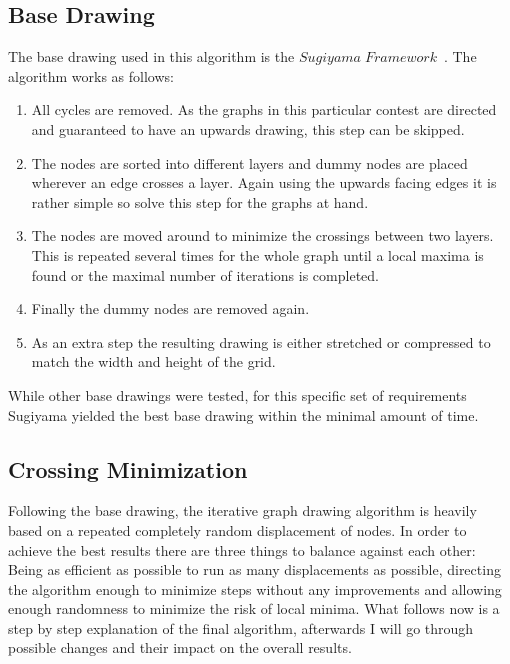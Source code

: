 \documentclass[]{llncs}
\begin{document}
    \subsection{Base Drawing}
	The base drawing used in this algorithm is the $Sugiyama\;Framework$~\cite{reference/algo/Nikolov16a}. The algorithm works as follows:
	\begin{enumerate}
		\item All cycles are removed. As the graphs in this particular contest are directed and guaranteed to have an upwards drawing, this step can be skipped.
		\item The nodes are sorted into different layers and dummy nodes are placed wherever an edge crosses a layer. Again using the upwards facing edges it is rather simple so solve this step for the graphs at hand.
		\item The nodes are moved around to minimize the crossings between two layers. This is repeated several times for the whole graph until a local maxima is found or the maximal number of iterations is completed.
		\item Finally the dummy nodes are removed again.	
		\item As an extra step the resulting drawing is either stretched or compressed to match the width and height of the grid.
	\end{enumerate}

	While other base drawings were tested, for this specific set of requirements Sugiyama yielded the best base drawing within the minimal amount of time.	

    \subsection{Crossing Minimization}

	Following the base drawing, the iterative graph drawing algorithm is heavily based on a repeated completely random displacement of nodes. In order to achieve the best results there are three things to balance against each other: Being as efficient as possible to run as many displacements as possible, directing the algorithm enough to minimize steps without any improvements and allowing enough randomness to minimize the risk of local minima. What follows now is a step by step explanation of the final algorithm, afterwards I will go through possible changes and their impact on the overall results.
\end{document}
